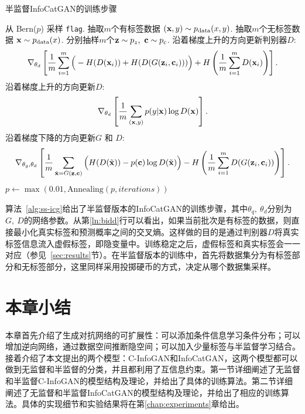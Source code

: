 \begin{algorithm}[htbp]
  \small
  \caption{半监督InfoCatGAN的训练步骤}
  \label{alg:ss-icg}
  \begin{algorithmic}[1]
      \State 从 Bern($p$) 采样 \texttt{flag}.
        \State 抽取$m$个有标签数据 
        $(\mathbf{x}, y) \sim p_{\text{data}}(x,y)$.
      \Else
        \State 抽取$m$个无标签数据 
        $\mathbf{x} \sim p_{\text{data}}(x)$.
      \EndIf
      \State 分别抽样$m$个$\mathbf{z}\sim p_z, ~\mathbf{c}\sim p_c$.
      \State 沿着梯度上升的方向更新判别器$D$:
      \label{ln:catdss}
      \[
        \nabla_{\theta_d} \left[ 
          \frac{1}{m} \sum_{i=1}^m \Big( 
            - H(D(\mathbf{x}_i)) + H(D(G(\mathbf{z}_i, \mathbf{c}_i)))
          \Big) + H\left( \frac{1}{m}\sum_{i=1}^m D(\mathbf{x}_i) \right)
        \right].
      \]
        \State 沿着梯度上升的方向更新$D$:
        \label{ln:bidd}
        \[
          \nabla_{\theta_d} \left[ 
            \frac{1}{m} \sum_{(\mathbf{x}, y)} p(y|\mathbf{x}) \log D(\bf{x}) 
          \right].
        \]
      \EndIf
      \State 沿着梯度下降的方向更新$G$ 和 $D$:
      \label{ln:catgss}
      \[
        \nabla_{\theta_g,\theta_d} \left[ 
          \frac{1}{m} \sum_{\tilde{\mathbf{x}} = G(\mathbf{z},\mathbf{c})} \Big(
            H(D(\tilde{\mathbf{x}})) - p(\mathbf{c})\log D(\tilde{\mathbf{x}})
          \Big)
          - H \left( 
            \frac{1}{m}\sum_{i=1}^m D(G(\mathbf{z}_i, \mathbf{c}_i))
          \right)
        \right].
      \]
      \State $p \gets \max(0.01, \text{Annealing}(p, iterations))$ 
    \EndFor
  \end{algorithmic}
\end{algorithm}
算法~\ref{alg:ss-icg}给出了半监督版本的InfoCatGAN的训练步骤，其中$\theta_q,~\theta_d$分别为$G,~D$的网络参数。从第\ref{ln:bidd}行可以看出，如果当前批次是有标签的数据，则直接最小化真实标签和预测概率之间的交叉熵。这样做的目的是通过判别器$D$将真实标签信息流入虚假标签，即隐变量中。训练稳定之后，虚假标签和真实标签会一一对应（参见~\ref{sec:results}节）。在半监督版本的训练中，首先将数据集分为有标签部分和无标签部分，这里同样采用投掷硬币的方式，决定从哪个数据集采样。

\section{本章小结}
本章首先介绍了生成对抗网络的可扩展性：可以添加条件信息学习条件分布；可以增加逆向网络，通过数据空间推断隐空间；可以加入少量标签与半监督学习结合。接着介绍了本文提出的两个模型：C-InfoGAN和InfoCatGAN，这两个模型都可以做到无监督和半监督的分类，并且都利用了互信息约束。第一节详细阐述了无监督和半监督C-InfoGAN的模型结构及理论，并给出了具体的训练算法。第二节详细阐述了无监督和半监督InfoCatGAN的模型结构及理论，并给出了相应的训练算法。具体的实现细节和实验结果将在第\ref{chap:experiments}章给出。
